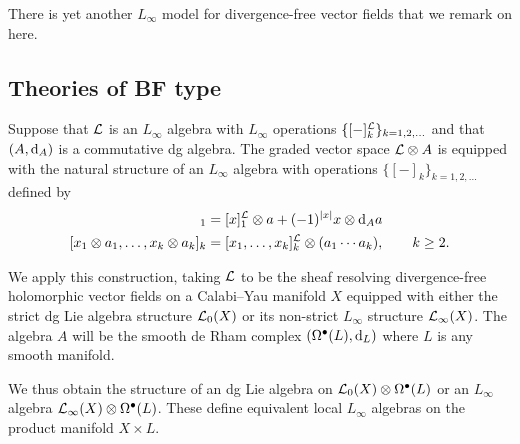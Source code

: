 \documentclass[11pt]{amsart}
\begin{document}


\parsec
There is yet another $L_\infty$ model for divergence-free vector fields that we remark on here.


\subsection{Theories of BF type}

\parsec
Suppose that $\mathcal L$ is an $L_\infty$ algebra with $L_\infty$ operations $\{[-]^\mathcal L_k\}_{k=1,2,\ldots}$ and that $(A, {\rm d}_A)$ is a commutative dg algebra. 
The graded vector space $\mathcal L \otimes A$ is equipped with the natural structure of an $L_\infty$ algebra with operations $\{[-]_k\}_{k=1,2,\ldots}$ defined by
\begin{align*}
[x \otimes a]_1 & = [x]^\cL_1 \otimes a + (-1)^{|x|} x \otimes \d_A a \\
[x_1 \otimes a_1, \ldots , x_k \otimes a_k]_k & = [x_1,\ldots,x_k]^\cL_k \otimes (a_1 \cdots a_k), \qquad k \geq 2 .
\end{align*}

We apply this construction, taking $\mathcal L$ to be the sheaf resolving divergence-free holomorphic vector fields on a Calabi--Yau manifold $X$ equipped with either the strict dg Lie algebra structure $\mathcal L_0(X)$ or its non-strict $L_\infty$ structure $\mathcal L_\infty (X)$. 
The algebra $A$ will be the smooth de Rham complex $(\Omega^\bullet(L) , {\rm d}_L)$ where $L$ is any smooth manifold. 

We thus obtain the structure of an dg Lie algebra on $\mathcal L_0(X) \otimes \Omega^{\bullet}(L)$ or an $L_\infty$ algebra $\mathcal L_\infty(X) \otimes \Omega^\bullet(L)$.
These define equivalent local $L_\infty$ algebras on the product manifold $X \times L$. 

\subsubsection{}
\end{document}
